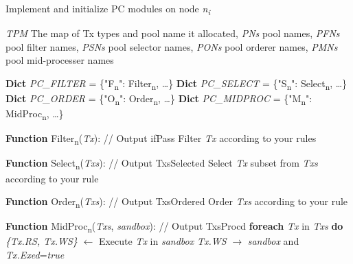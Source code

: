 \documentclass[journal]{IEEEtran}
\begin{document}
\begin{algorithm}
\caption{Implement and initialize PC modules on node \textit{n\textsubscript{i}}}
\begin{algorithmic}[1]

\Require \normalsize \textit{TPM} \footnotesize The map of Tx types and pool name it allocated, \normalsize \textit{PNs} \footnotesize pool names, \normalsize \textit{PFNs} \footnotesize pool filter names, \normalsize \textit{PSNs} \footnotesize pool selector names, \normalsize \textit{PONs} \footnotesize pool orderer names, \normalsize \textit{PMNs} \footnotesize pool mid-processer names \normalsize

\State \textbf{Dict} \textit{PC\_FILTER} = \{"F\textsubscript{n}": Filter\textsubscript{n}, \dots\}
\State \textbf{Dict} \textit{PC\_SELECT} = \{"S\textsubscript{n}": Select\textsubscript{n}, \dots\}
\State \textbf{Dict} \textit{PC\_ORDER} = \{"O\textsubscript{n}": Order\textsubscript{n}, \dots\}
\State \textbf{Dict} \textit{PC\_MIDPROC} = \{"M\textsubscript{n}": MidProc\textsubscript{n}, \dots\}

\State \textbf{Function} Filter\textsubscript{n}(\textit{Tx}): \footnotesize // Output ifPass \normalsize
    \State \hspace{5mm} \small Filter \textit{Tx} according to your rules \normalsize

\State \textbf{Function} Select\textsubscript{n}(\textit{Txs}): \footnotesize // Output TxsSelected \normalsize
    \State \hspace{5mm} \small Select \textit{Tx} subset from \textit{Txs} according to your rule \normalsize

\State \textbf{Function} Order\textsubscript{n}(\textit{Txs}): \footnotesize // Output TxsOrdered \normalsize
    \State \hspace{5mm} \small Order \textit{Txs} according to your rule \normalsize

\State \textbf{Function} MidProc\textsubscript{n}(\textit{Txs}, \textit{sandbox}): \footnotesize // Output TxsProcd \normalsize
    \State \hspace{5mm} \textbf{foreach} \textit{Tx} in \textit{Txs} \textbf{do}
        \State \hspace{10mm} \textit{\{Tx.RS, Tx.WS\}} $\leftarrow{}$ Execute \textit{Tx} in \textit{sandbox}
        \State \hspace{10mm} \textit{Tx.WS} $\rightarrow{}$ \textit{sandbox} and \textit{Tx.Exed}=\textit{true}
        

\end{algorithmic}
\end{algorithm}
\end{document}
